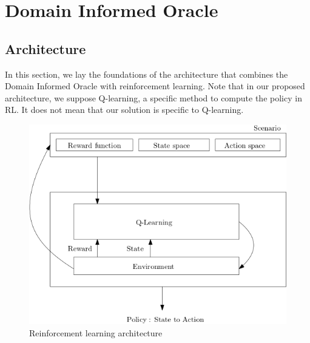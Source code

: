 \section{Domain Informed Oracle} 
\subsection{Architecture}
In this section, we lay the foundations of the architecture that combines the Domain Informed Oracle with 
reinforcement learning. Note that in our proposed architecture, we suppose Q-learning, a specific method to compute the policy in RL. 
It does not mean that our solution is specific to Q-learning. 

\medskip 

\begin{figure}[H]
  \centering
  \includegraphics[scale=0.41]{figures/basicrl.png}
  \caption{Reinforcement learning architecture}
  \label{fig:basicrl}
\end{figure}


